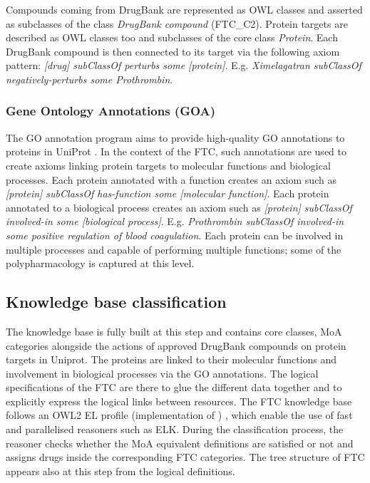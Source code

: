 Compounds coming from DrugBank are represented as OWL classes and asserted as subclasses of the class \emph{DrugBank compound} (FTC\_C2). Protein targets are described as OWL classes too and subclasses of the core class \emph{Protein}. Each DrugBank compound is then connected to its target via the following axiom pattern: \emph{[drug] subClassOf perturbs some [protein]}. E.g. \emph{Ximelagatran subClassOf negatively-perturbs some Prothrombin}.

\subsubsection{Gene Ontology Annotations (GOA)}
The GO annotation program aims to provide high-quality GO annotations to proteins in UniProt \citep{dimmer2012uniprot}. In the context of the FTC, such annotations are used to create axioms linking protein targets to molecular functions and biological processes. Each protein annotated with a function creates an axiom such as \emph{[protein] subClassOf has-function some [molecular function]}. Each protein annotated to a biological process creates an axiom such as \emph{[protein] subClassOf involved-in some [biological process]}. E.g. \emph{Prothrombin subClassOf involved-in some positive regulation of blood coagulation}. Each protein can be involved in multiple processes and capable of performing multiple functions; some of the polypharmacology is captured at this level.

\subsection{Knowledge base classification}
The knowledge base is fully built at this step and contains core classes, MoA categories alongside the actions of approved DrugBank compounds on protein targets in Uniprot. The proteins are linked to their molecular functions and involvement in biological processes via the GO annotations. The logical specifications of the FTC are there to glue the different data together and to explicitly express the logical links between resources. The FTC knowledge base follows an OWL2 EL profile (implementation of ) \citep{motik2009owl}, which enable the use of fast and parallelised reasoners such as ELK. During the classification process, the reasoner checks whether the MoA equivalent definitions are satisfied or not and assigns drugs inside the corresponding FTC categories. The tree structure of FTC appears also at this step from the logical definitions.

